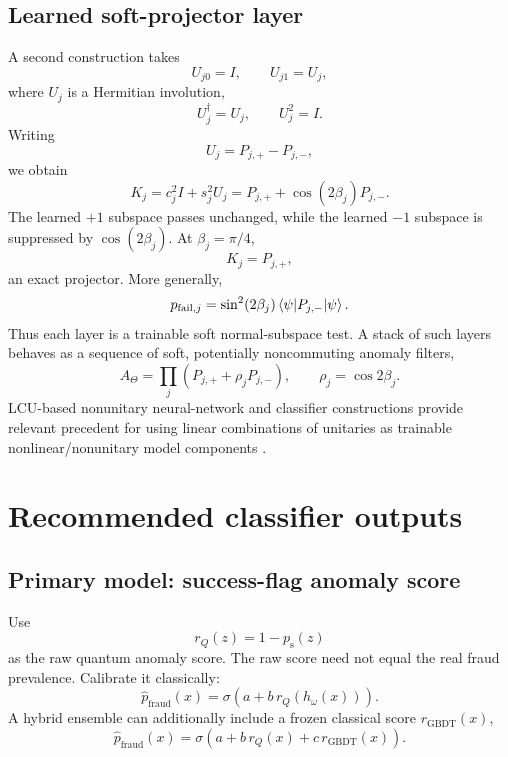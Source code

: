 \documentclass[11pt,a4paper]{article}
\newcommand{\psucc}{p_{\mathrm{s}}}
\newcommand{\pfraud}{p_{\mathrm{fraud}}}
\begin{document}
\subsection{Learned soft-projector layer}

A second construction takes
\begin{equation}
    U_{j0}=I,\qquad U_{j1}=U_j,
\end{equation}
where $U_j$ is a Hermitian involution,
\begin{equation}
    U_j^\dagger=U_j,\qquad U_j^2=I.
\end{equation}
Writing
\begin{equation}
    U_j=P_{j,+}-P_{j,-},
\end{equation}
we obtain
\begin{equation}
K_j=c_j^2I+s_j^2U_j
=P_{j,+}+\cos(2\beta_j)P_{j,-}.
\end{equation}
The learned $+1$ subspace passes unchanged, while the learned $-1$ subspace is suppressed by $\cos(2\beta_j)$. At $\beta_j=\pi/4$,
\begin{equation}
    K_j=P_{j,+},
\end{equation}
an exact projector. More generally,
\begin{equation}
    p_{\mathrm{fail},j}
    =\sin^2(2\beta_j)\mel{\psi}{P_{j,-}}{\psi}.
\end{equation}
Thus each layer is a trainable soft normal-subspace test. A stack of such layers behaves as a sequence of soft, potentially noncommuting anomaly filters,
\begin{equation}
A_\Theta
=
\prod_j\left(P_{j,+}+\rho_jP_{j,-}\right),
\qquad \rho_j=\cos 2\beta_j.
\end{equation}
LCU-based nonunitary neural-network and classifier constructions provide relevant precedent for using linear combinations of unitaries as trainable nonlinear/nonunitary model components \cite{LCUClassifier2024}.

\section{Recommended classifier outputs}

\subsection{Primary model: success-flag anomaly score}

Use
\begin{equation}
    r_Q(z)=1-\psucc(z)
\end{equation}
as the raw quantum anomaly score. The raw score need not equal the real fraud prevalence. Calibrate it classically:
\begin{equation}
\widehat \pfraud(x)
=
\sigma\!\left(a+b\,r_Q(h_\omega(x))\right).
\end{equation}
A hybrid ensemble can additionally include a frozen classical score $r_{\mathrm{GBDT}}(x)$,
\begin{equation}
\widehat \pfraud(x)
=
\sigma\!\left(
 a+b\,r_Q(x)+c\,r_{\mathrm{GBDT}}(x)
\right).
\end{equation}
\end{document}
